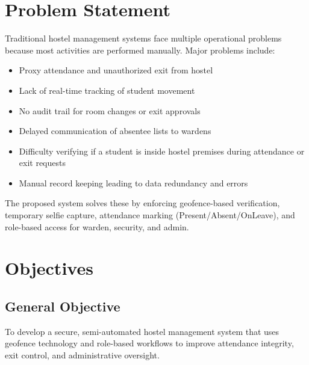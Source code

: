 \documentclass[12pt,a4paper]{article}
\begin{document}
\section{Problem Statement}

Traditional hostel management systems face multiple operational problems because most activities are performed manually. Major problems include:

\begin{itemize}
    \item Proxy attendance and unauthorized exit from hostel
    \item Lack of real-time tracking of student movement
    \item No audit trail for room changes or exit approvals
    \item Delayed communication of absentee lists to wardens
    \item Difficulty verifying if a student is inside hostel premises during attendance or exit requests
    \item Manual record keeping leading to data redundancy and errors
\end{itemize}

The proposed system solves these by enforcing geofence-based verification, temporary selfie capture, attendance marking (Present/Absent/OnLeave), and role-based access for warden, security, and admin.

\section{Objectives}

\subsection{General Objective}
To develop a secure, semi-automated hostel management system that uses geofence technology and role-based workflows to improve attendance integrity, exit control, and administrative oversight.
\end{document}
